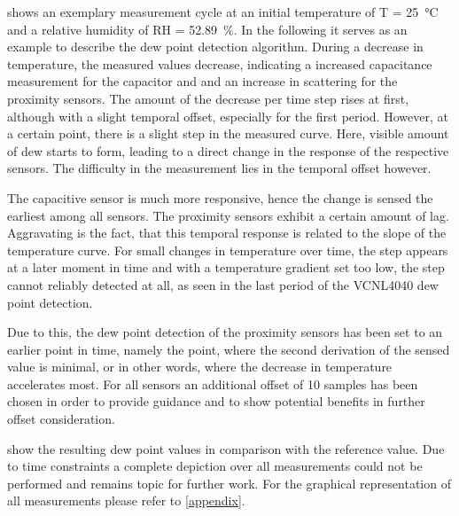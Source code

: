 shows an exemplary measurement cycle at an initial temperature of T = \qty{25}{\celsius} and a relative humidity of RH = \qty{52.89}{\percent}. In the following it serves as an example to describe the dew point detection algorithm. During a decrease in temperature, the measured values decrease, indicating a increased capacitance measurement for the capacitor and and an increase in scattering for the proximity sensors. The amount of the decrease per time step rises at first, although with a slight temporal offset, especially for the first period. However, at a certain point, there is a slight step in the measured curve. Here, visible amount of dew starts to form, leading to a direct change in the response of the respective sensors. The difficulty in the measurement lies in the temporal offset however. 

The capacitive sensor is much more responsive, hence the change is sensed the earliest among all sensors. The proximity sensors exhibit a certain amount of lag. Aggravating is the fact, that this temporal response is related to the slope of the temperature curve. For small changes in temperature over time, the step appears at a later moment in time and with a temperature gradient set too low, the step cannot reliably detected at all, as seen in the last period of the VCNL4040 dew point detection.

Due to this, the dew point detection of the proximity sensors has been set to an earlier point in time, namely the point, where the second derivation of the sensed value is minimal, or in other words, where the decrease in temperature accelerates most. For all sensors an additional offset of 10 samples has been chosen in order to provide guidance and to show potential benefits in further offset consideration.

 show the resulting dew point values in comparison with the reference value. Due to time constraints a complete depiction over all measurements could not be performed and remains topic for further work. For the graphical representation of all measurements please refer to \cref{appendix}.

